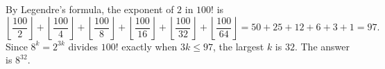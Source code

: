 By Legendre's formula, the exponent of $2$ in $100!$ is
\[
\left\lfloor\dfrac{100}{2}\right\rfloor+\left\lfloor\dfrac{100}{4}\right\rfloor+\left\lfloor\dfrac{100}{8}\right\rfloor+\left\lfloor\dfrac{100}{16}\right\rfloor+\left\lfloor\dfrac{100}{32}\right\rfloor+\left\lfloor\dfrac{100}{64}\right\rfloor=50+25+12+6+3+1=97 .
\]
Since $8^k=2^{3k}$ divides $100!$ exactly when $3k\le97$, the largest $k$ is $32$. The answer is $\boxed{8^{32}}$.
